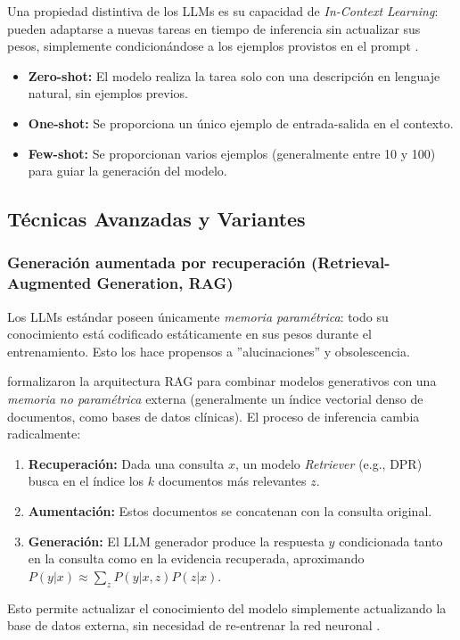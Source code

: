 \documentclass[11pt, a4paper]{article}
\begin{document}
Una propiedad distintiva de los LLMs es su capacidad de \textit{In-Context Learning}: pueden adaptarse a nuevas tareas en tiempo de inferencia sin actualizar sus pesos, simplemente condicionándose a los
ejemplos provistos en el prompt \cite{brown_language_nodate}.

\begin{itemize}
    \item \textbf{Zero-shot:} El modelo realiza la tarea solo con una descripción en lenguaje natural, sin ejemplos previos.
    \item \textbf{One-shot:} Se proporciona un único ejemplo de entrada-salida en el contexto.
    \item \textbf{Few-shot:} Se proporcionan varios ejemplos (generalmente entre 10 y 100) para guiar la generación del modelo.
\end{itemize}

\subsection{Técnicas Avanzadas y Variantes}

\subsubsection{Generación aumentada por recuperación (Retrieval-Augmented Generation, RAG)}
Los LLMs estándar poseen únicamente \textit{memoria paramétrica}: todo su conocimiento está codificado estáticamente en sus pesos durante el entrenamiento. Esto los hace propensos a ''alucinaciones''
y obsolescencia.

\cite{lewis_retrieval-augmented_nodate} formalizaron la arquitectura RAG para combinar modelos generativos con una \textit{memoria no paramétrica} externa (generalmente un índice vectorial denso de documentos,
como bases de datos clínicas). El proceso de inferencia cambia radicalmente:
\begin{enumerate}
    \item \textbf{Recuperación:} Dada una consulta $x$, un modelo \textit{Retriever} (e.g., DPR) busca en el índice los $k$ documentos más relevantes $z$.
    \item \textbf{Aumentación:} Estos documentos se concatenan con la consulta original.
    \item \textbf{Generación:} El LLM generador produce la respuesta $y$ condicionada tanto en la consulta como en la evidencia recuperada, aproximando $P(y|x) \approx \sum_{z} P(y|x,z)P(z|x)$.
\end{enumerate}
Esto permite actualizar el conocimiento del modelo simplemente actualizando la base de datos externa, sin necesidad de re-entrenar la red neuronal \cite{lewis_retrieval-augmented_nodate}.
\end{document}

